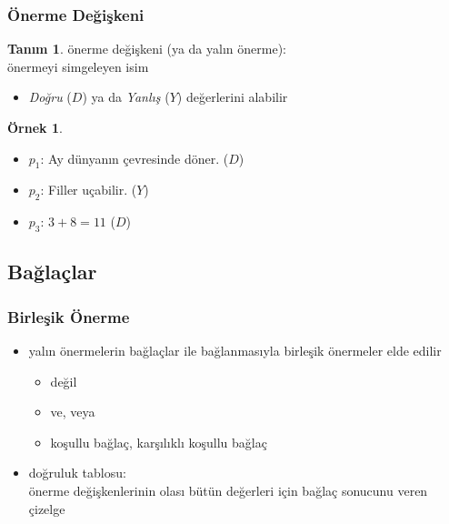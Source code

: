 \documentclass[dvipsnames]{beamer}
\theoremstyle{definition}
\newtheorem{tanim}[theorem]{Tanım}
\theoremstyle{example}
\newtheorem{ornek}[theorem]{Örnek}
\theoremstyle{plain}
\begin{document}
\begin{frame}
  \frametitle{Önerme Değişkeni}

  \begin{tanim}
    \alert{önerme değişkeni} (ya da \alert{yalın önerme}):\\
      önermeyi simgeleyen isim

    \begin{itemize}
      \item \emph{Doğru} ($D$) ya da \emph{Yanlış} ($Y$) değerlerini alabilir
    \end{itemize}
  \end{tanim}

  \pause
  \begin{ornek}
    \begin{itemize}
      \item $p_1$: Ay dünyanın çevresinde döner. ($D$)
      \item $p_2$: Filler uçabilir. ($Y$)
      \item $p_3$: $3+8=11$ ($D$)
    \end{itemize}
  \end{ornek}
\end{frame}

\subsection{Bağlaçlar}

\begin{frame}
  \frametitle{Birleşik Önerme}

  \begin{itemize}
    \item yalın önermelerin \alert{bağlaçlar} ile bağlanmasıyla
      \alert{birleşik önermeler} elde edilir
    \begin{itemize}
      \item değil
      \item ve, veya
      \item koşullu bağlaç, karşılıklı koşullu bağlaç
    \end{itemize}
  \end{itemize}

  \pause
  \begin{itemize}
    \item \alert{doğruluk tablosu}:\\
      önerme değişkenlerinin olası bütün değerleri için bağlaç sonucunu veren
      çizelge
  \end{itemize}
\end{frame}
\end{document}
